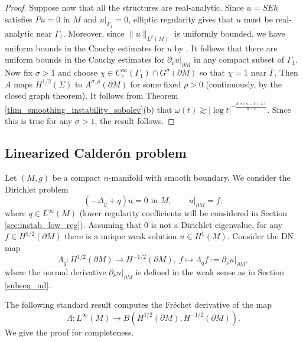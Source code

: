 \documentclass[12pt,twoside]{amsart}
\numberwithin{equation}{section}
\newcommand {\p} {\partial}
\newcommand{\abs}[1]{\lvert #1 \rvert}          %
\newcommand{\norm}[1]{\lVert #1 \rVert}         %
\newcommand{\ol}[1]{\overline{#1}}
\begin{document}
\begin{proof}
Suppose now that all the structures are real-analytic. Since $u = SEh$ satisfies $Pu = 0$ in $M$ and $u|_{\Gamma_1} = 0$, elliptic regularity gives that $u$ must be real-analytic near $\Gamma_1$. Moreover, since $\norm{u}_{L^2(M)}$ is uniformly bounded, we have uniform bounds in the Cauchy estimates for $u$ by \cite[Theorem 1.3 in Chapter 8 of vol. III]{LionsMagenes}. It follows that there are uniform bounds in the Cauchy estimates for $\p_{\nu} u|_{\p M}$ in any compact subset of $\Gamma_1$. Now fix $\sigma > 1$ and choose $\chi \in C^{\infty}_c(\Gamma_1) \cap G^{\sigma}(\p M)$ so that $\chi = 1$ near $\ol{\Gamma}$. Then $A$ maps $H^{1/2}(\Sigma)$ to $A^{\sigma,\rho}(\p M)$ for some fixed $\rho > 0$ (continuously, by the closed graph theorem). It follows from Theorem \ref{thm_smoothing_instability_sobolev}(b)
that $\omega(t) \gtrsim \abs{\log t}^{-\frac{\delta(\sigma(n-1)+1}{n-1}}$. Since this is true for any $\sigma > 1$, the result follows.
\end{proof}


\subsection{Linearized Calder\'on problem}

Let $(M,g)$ be a compact $n$-manifold with smooth boundary. We consider the Dirichlet problem 
\[
(-\Delta_g + q) u = 0 \text{ in $M$}, \qquad u|_{\p M} = f,
\]
where $q \in L^{\infty}(M)$ (lower regularity coefficients will be considered in Section \ref{sec:instab_low_reg}). Assuming that $0$ is not a Dirichlet eigenvalue, for any $f \in H^{1/2}(\p M)$ there is a unique weak solution $u \in H^1(M)$. Consider the DN map 
\[
\Lambda_q: H^{1/2}(\p M) \to H^{-1/2}(\p M), \  f \mapsto \Lambda_q f:= \p_{\nu} u|_{\p M},
\]
where the normal derivative $\p_{\nu} u|_{\p M}$ is defined in the weak sense as in Section \ref{subseq_nd}.

The following standard result computes the Fr\'echet derivative of the map 
\[
\Lambda: L^{\infty}(M) \to B(H^{1/2}(\p M), H^{-1/2}(\p M)).
\]
We give the proof for completeness.
\end{document}
